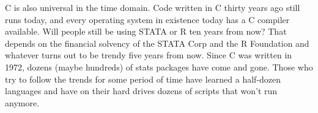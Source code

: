 C is also universal in the time domain. Code written in C thirty years
ago still runs today, and every operating system in existence today has a C
compiler available. Will people still be using STATA or R ten years from now?
That depends on the financial solvency of the STATA Corp and the
R Foundation and whatever turns out to be trendy five years from now.
Since C was written in 1972, dozens (maybe hundreds) of stats packages
have come and gone. Those who try to follow the trends for
some period of time have learned a half-dozen languages
and have on their hard drives dozens of scripts that won't run anymore.
